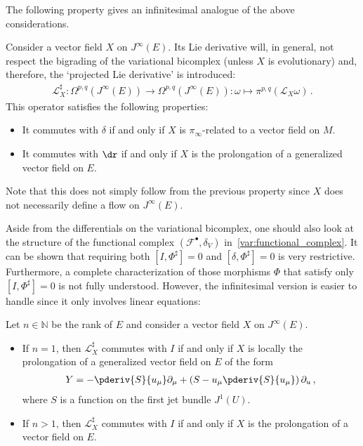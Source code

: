     The following property gives an infinitesimal analogue of the above considerations.
    \begin{property}
        Consider a vector field $X$ on $J^\infty(E)$. Its Lie derivative will, in general, not respect the bigrading of the variational bicomplex (unless $X$ is evolutionary) and, therefore, the `projected Lie derivative' is introduced:
        \begin{gather}
            \mathcal{L}^\sharp_X:\Omega^{p,q}(J^\infty(E))\rightarrow\Omega^{p,q}(J^\infty(E)):\omega\mapsto\pi^{p,q}(\mathcal{L}_X\omega)\,.
        \end{gather}
        This operator satisfies the following properties:
        \begin{itemize}
            \item It commutes with $\delta$ if and only if $X$ is $\pi_\infty$-related to a vector field on $M$.
            \item It commutes with $\dr$ if and only if $X$ is the prolongation of a generalized vector field on $E$.
        \end{itemize}
        Note that this does not simply follow from the previous property since $X$ does not necessarily define a flow on $J^\infty(E)$.
    \end{property}

    Aside from the differentials on the variational bicomplex, one should also look at the structure of the functional complex $(\mathcal{F}^\bullet,\delta_V)$ in~\eqref{var:functional_complex}. It can be shown that requiring both $[I,\Phi^\sharp]=0$ and $[\delta,\Phi^\sharp]=0$ is very restrictive. Furthermore, a complete characterization of those morphisms $\Phi$ that satisfy only $[I,\Phi^\sharp]=0$ is not fully understood. However, the infinitesimal version is easier to handle since it only involves linear equations:
    \begin{property}
        Let $n\in\mathbb{N}$ be the rank of $E$ and consider a vector field $X$ on $J^\infty(E)$.
        \begin{itemize}
            \item If $n=1$, then $\mathcal{L}^\sharp_X$ commutes with $I$ if and only if $X$ is locally the prolongation of a generalized vector field on $E$ of the form
            \begin{gather}
                Y = -\pderiv{S}{u_\mu}\partial_\mu + \left(S - u_\mu\pderiv{S}{u_\mu}\right)\partial_u\,,
            \end{gather}
            where $S$ is a function on the first jet bundle $J^1(U)$.
            \item If $n>1$, then $\mathcal{L}^\sharp_X$ commutes with $I$ if and only if $X$ is the prolongation of a vector field on $E$.
        \end{itemize}
    \end{property}

